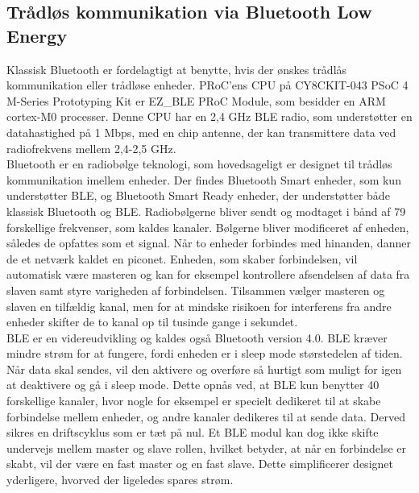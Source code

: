 \subsection{Trådløs kommunikation via Bluetooth Low Energy} 
Klassisk Bluetooth er fordelagtigt at benytte, hvis der ønskes trådlås kommunikation eller trådløse enheder. PRoC'ens CPU på CY8CKIT-043 PSoC 4 M-Series Prototyping Kit er EZ\_BLE PRoC Module, som besidder en ARM cortex-M0 processer.%
Denne CPU har en 2,4 GHz BLE radio, som understøtter en datahastighed på 1 Mbps, med en chip antenne, der kan transmittere data ved radiofrekvens mellem 2,4-2,5 GHz. %
\citep{Semiconductor2016PRoC,Semiconductor2016BLEdyb}\\
Bluetooth er en radiobølge teknologi, som hovedsageligt er designet til trådløs kommunikation imellem enheder. Der findes Bluetooth Smart enheder, som kun understøtter BLE, og Bluetooth Smart Ready enheder, der understøtter både klassisk Bluetooth og BLE. Radiobølgerne bliver sendt og modtaget i bånd af 79 forskellige frekvenser, som kaldes kanaler. Bølgerne bliver modificeret af enheden, således de opfattes som et signal. Når to enheder forbindes med hinanden, danner de et netværk kaldet en piconet. Enheden, som skaber forbindelsen, vil automatisk være masteren og kan for eksempel kontrollere afsendelsen af data fra slaven samt styre varigheden af forbindelsen. Tilsammen vælger masteren og slaven en tilfældig kanal, men for at mindske risikoen for interferens fra andre enheder skifter de to kanal op til tusinde gange i sekundet. \citep{CYPRESS2016workshopBLE,Sauter2011} \\
BLE er en videreudvikling og kaldes også Bluetooth version 4.0. BLE kræver mindre strøm for at fungere, fordi enheden er i sleep mode størstedelen af tiden. Når data skal sendes, vil den aktivere og overføre så hurtigt som muligt for igen at deaktivere og gå i sleep mode. Dette opnås ved, at BLE kun benytter 40 forskellige kanaler, hvor nogle for eksempel er specielt dedikeret til at skabe forbindelse mellem enheder, og andre kanaler dedikeres til at sende data. Derved sikres en driftscyklus som er tæt på nul. Et BLE modul kan dog ikke skifte undervejs mellem master og slave rollen, hvilket betyder, at når en forbindelse er skabt, vil der være en fast master og en fast slave. Dette simplificerer designet yderligere, hvorved der ligeledes spares strøm. \citep{Gupta2013}